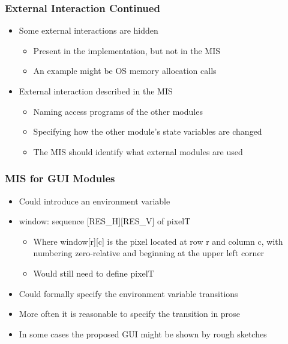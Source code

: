 \documentclass[t,12pt,numbers,fleqn]{beamer}
\begin{document}

\begin{frame}
\frametitle{External Interaction Continued}

\begin{itemize}
\item Some external interactions are hidden
\begin{itemize}
\item Present in the implementation, but not in the MIS
\item An example might be OS memory allocation calls
\end{itemize}
\item External interaction described in the MIS
\begin{itemize}
\item Naming access programs of the other modules
\item Specifying how the other module's state variables are changed
\item The MIS should identify what external modules are used
\end{itemize}
\end{itemize}

\end{frame}


\begin{frame}
\frametitle{MIS for GUI Modules}

\begin{itemize}
\item Could introduce an environment variable
\item window: sequence [RES\_H][RES\_V] of pixelT
\begin{itemize}
\item Where window[r][c] is the pixel located at row r and column c, with numbering zero-relative and beginning at the
upper left corner
\item Would still need to define pixelT
\end{itemize}
\item Could formally specify the environment variable transitions
\item More often it is reasonable to specify the transition in prose
\item In some cases the proposed GUI might be shown by rough sketches
\end{itemize}

\end{frame}
\end{document}
